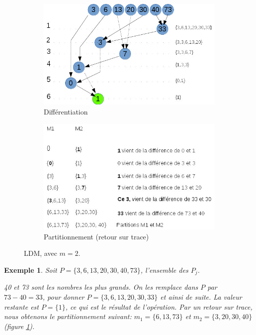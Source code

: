 \documentclass[a4paper,12pt]{report}
\theoremstyle{plain}				%
\newtheorem{example}{Exemple}
\theoremstyle{definition}				%
\begin{document}
\begin{itemize}
\begin{figure}
{\centering}
	\begin{subfigure}[b]{0.45\linewidth}
    \includegraphics[width=\linewidth]
    {Biblio_PCmax_Rendu_exLDM_1_2m.jpg}
    \caption{Différentiation}
  	\end{subfigure}
\hfill%
	\begin{subfigure}[b]{0.45\linewidth}
    \includegraphics[width=\linewidth]
    {Biblio_PCmax_Rendu_exLDM_2_2m.jpg}
    \caption{Partitionnement (retour sur trace)}
  	\end{subfigure}
  	\caption{LDM, avec $m=2$.}
  	\label{fig:LDM2M}
\end{figure}

\begin{example}
Soit $P=\{3,6,13,20,30,40,73\}$, l'ensemble des $P_j$.

40 et 73 sont les nombres les plus grands.
On les remplace dans $P$ par $73 - 40 = 33$, pour donner
$P=\{3,6,13,20,30,33\}$ et ainsi de suite.
La valeur restante est $P= \{1\}$, ce qui est le résultat de
l'opération.
Par un retour sur trace, nous obtenons le partitionnement suivant:
$m_1 = \{ 6,13,73 \}$ et $m_2 = \{ 3,20,30,40 \}$ (figure
\ref{fig:LDM2M}).


\end{example}
\end{itemize}
\end{document}
